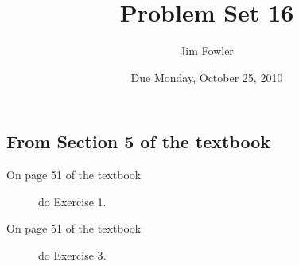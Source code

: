 \documentclass[12pt]{handout}
\author{Jim Fowler}
\title{Problem Set 16}
\date{Due Monday, October 25, 2010}
\begin{document}
\maketitle










\subsection*{From Section 5 of the textbook}



\begin{description}

\item[On page 51 of the textbook] do Exercise 1.

\item[On page 51 of the textbook] do Exercise 3.

\end{description}
\end{document}
